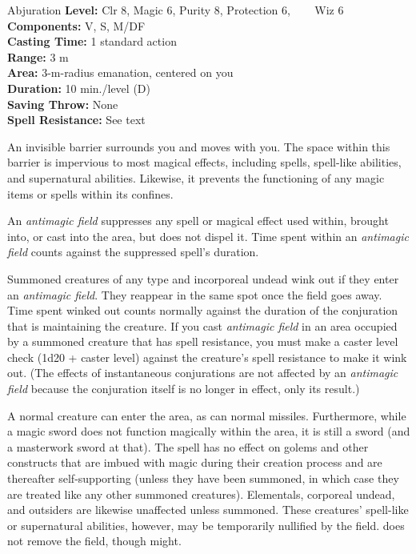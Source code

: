 {Abjuration}
{
	\textbf{Level:}
	Clr 8, Magic 6, Purity 8, Protection 6, ~~~ Wiz 6\\
	\textbf{Components:}
	V, S, M/DF\\
	\textbf{Casting Time:}
	1 standard action\\
	\textbf{Range:}
	3 m\\
	\textbf{Area:}
	3-m-radius emanation, centered on you\\
	\textbf{Duration:}
	10 min./level (D)\\
	\textbf{Saving Throw:}
	None\\
	\textbf{Spell Resistance:}
	See text\\
}
{
	An invisible barrier surrounds you and moves with you. The space within this barrier is impervious to most magical effects, including spells, spell-like abilities, and supernatural abilities. Likewise, it prevents the functioning of any magic items or spells within its confines.

	An \emph{antimagic field} suppresses any spell or magical effect used within, brought into, or cast into the area, but does not dispel it. Time spent within an \emph{antimagic field} counts against the suppressed spell's duration.

	Summoned creatures of any type and incorporeal undead wink out if they enter an \emph{antimagic field}. They reappear in the same spot once the field goes away. Time spent winked out counts normally against the duration of the conjuration that is maintaining the creature. If you cast \emph{antimagic field} in an area occupied by a summoned creature that has spell resistance, you must make a caster level check (1d20 + caster level) against the creature's spell resistance to make it wink out. (The effects of instantaneous conjurations are not affected by an \emph{antimagic field} because the conjuration itself is no longer in effect, only its result.)

	A normal creature can enter the area, as can normal missiles. Furthermore, while a magic sword does not function magically within the area, it is still a sword (and a masterwork sword at that). The spell has no effect on golems and other constructs that are imbued with magic during their creation process and are thereafter self-supporting (unless they have been summoned, in which case they are treated like any other summoned creatures). Elementals, corporeal undead, and outsiders are likewise unaffected unless summoned. These creatures' spell-like or supernatural abilities, however, may be temporarily nullified by the field.  does not remove the field, though  might.

}
